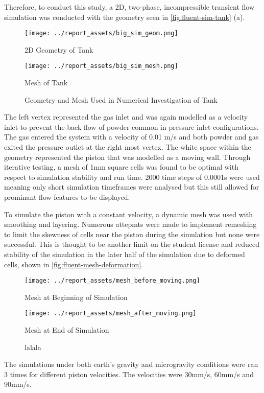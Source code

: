 Therefore, to conduct this study, a 2D, two-phase, incompressible transient flow simulation was conducted with the geometry seen in \autoref{fig:fluent-sim-tank} (a).
\begin{figure}[htbp]
    \centering

    \begin{minipage}{0.45\textwidth}
        \centering
        \texttt{[image: ../report\_assets/big\_sim\_geom.png]}
        \caption{2D Geometry of Tank}
    \end{minipage}
    \hfill
    \begin{minipage}{0.45\textwidth}
        \centering
        \texttt{[image: ../report\_assets/big\_sim\_mesh.png]}
        \caption{Mesh of Tank}\label{fig:mesh-tank}
    \end{minipage}
    \caption{Geometry and Mesh Used in Numerical Investigation of Tank}\label{fig:fluent-sim-tank}
\end{figure}
The left vertex represented the gas inlet and was again modelled as a velocity inlet to prevent the back flow of powder common in pressure inlet configurations. The gas entered the system with a velocity of 0.01 m/s and both powder and gas exited the pressure outlet at the right most vertex. The white space within the geometry represented the piston that was modelled as a moving wall. Through iterative testing, a mesh of 1mm square cells was found to be optimal with respect to simulation stability and run time. 2000 time steps of 0.0001s were used meaning only short simulation timeframes were analysed but this still allowed for prominant flow features to be displayed.

To simulate the piston with a constant velocity, a dynamic mesh was used with smoothing and layering. Numerous attepmts were made to implement remeshing to limit the skewness of cells near the piston during the simulation but none were successful. This is thought to be another limit on the student license and reduced stability of the simulation in the later half of the simulation due to deformed cells, shown in \autoref{fig:fluent-mesh-deformation}.
\begin{figure}[htbp]
    \centering

    \begin{minipage}{0.45\textwidth}
        \centering
        \texttt{[image: ../report\_assets/mesh\_before\_moving.png]}
        \caption{Mesh at Beginning of Simulation}\label{fig:beginning-mesh}
    \end{minipage}
    \hfill
    \begin{minipage}{0.45\textwidth}
        \centering
        \texttt{[image: ../report\_assets/mesh\_after\_moving.png]}
        \caption{Mesh at End of Simulation}
    \end{minipage}
    \caption{lalala}\label{fig:fluent-mesh-deformation}
\end{figure}
The simulations under both earth's gravity and microgravity conditions were ran 3 times for different piston velocities. The velocities were 30mm/s, 60mm/s and 90mm/s.


